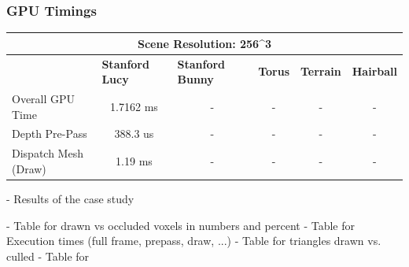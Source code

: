 \subsubsection*{GPU Timings}

\begin{table}[h]
    \begin{tabular}{|lccccc|}
    \hline
    \multicolumn{6}{|c|}{\textbf{Scene Resolution: 256\textasciicircum{}3}}                                                                                                                                                                                                         \\ \hline
    \multicolumn{1}{|l|}{}                          & \multicolumn{1}{l|}{\textbf{Stanford Lucy}}   & \multicolumn{1}{l|}{\textbf{Stanford Bunny}}  & \multicolumn{1}{l|}{\textbf{Torus}}   & \multicolumn{1}{l|}{\textbf{Terrain}}     & \multicolumn{1}{l|}{\textbf{Hairball}}    \\ \hline
    \multicolumn{1}{|l|}{Overall GPU Time}          & \multicolumn{1}{c|}{1.7162 ms}                & \multicolumn{1}{c|}{-}                        & \multicolumn{1}{c|}{-}                & \multicolumn{1}{c|}{-}                    & \multicolumn{1}{c|}{-}                    \\
    \multicolumn{1}{|l|}{Depth Pre-Pass}            & \multicolumn{1}{c|}{388.3 us}                 & \multicolumn{1}{c|}{-}                        & \multicolumn{1}{c|}{-}                & \multicolumn{1}{c|}{-}                    & -                                         \\
    \multicolumn{1}{|l|}{Dispatch Mesh (Draw)}      & \multicolumn{1}{c|}{1.19 ms}                  & \multicolumn{1}{c|}{-}                        & \multicolumn{1}{c|}{-}                & \multicolumn{1}{c|}{-}                    & -                                         \\ \hline
    \end{tabular}
\end{table}







- Results of the case study

- Table for drawn vs occluded voxels in numbers and percent
- Table for Execution times (full frame, prepass, draw, ...)
- Table for triangles drawn vs. culled 
- Table for 
